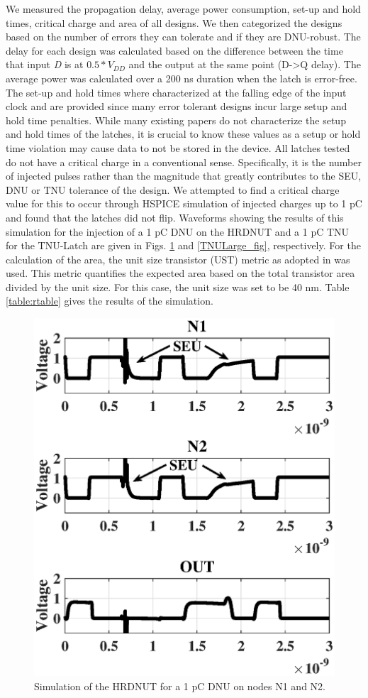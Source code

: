 We measured the propagation delay, average power consumption, set-up and hold times, critical charge and area of all designs. We then categorized the designs based on the number of errors they can tolerate and if they are DNU-robust. The delay for each design was calculated based on the difference between the time that input \textit{D} is at $0.5*V_{DD}$ and the output at the same point (D-\textgreater Q delay). The average power was calculated over a 200 ns duration when the latch is error-free. The set-up and hold times where characterized at the falling edge of the input clock and are provided since many error tolerant designs incur large setup and hold time penalties. While many existing papers do not characterize the setup and hold times of the latches, it is crucial to know these values as a setup or hold time violation may cause data to not be stored in the device. All latches tested do not have a critical charge in a conventional sense. Specifically, it is the number of injected pulses rather than the magnitude that greatly contributes to the SEU, DNU or TNU tolerance of the design. We attempted to find a critical charge value for this to occur through HSPICE simulation of injected charges up to 1 pC and found that the latches did not flip. Waveforms showing the results of this simulation for the injection of a 1 pC DNU on the HRDNUT and a 1 pC TNU for the TNU-Latch are given in Figs. \ref{DNULarge_fig} and \ref{TNULarge_fig}, respectively. For the calculation of the area, the unit size transistor (UST) metric as adopted in \cite{DNCS} was used. This metric quantifies the expected area based on the total transistor area divided by the unit size. For this case, the unit size was set to be 40 nm. Table \ref{table:rtable} gives the results of the simulation.

\begin{figure}[!htbp]
	\centering
	\includegraphics[trim = 0mm 10mm 0mm 9mm, clip, width=0.55\linewidth]{Figures/DNULargeCharge}
	\caption{Simulation of the HRDNUT for a 1 pC DNU on nodes N1 and N2.}
	\label{DNULarge_fig}
\end{figure}


